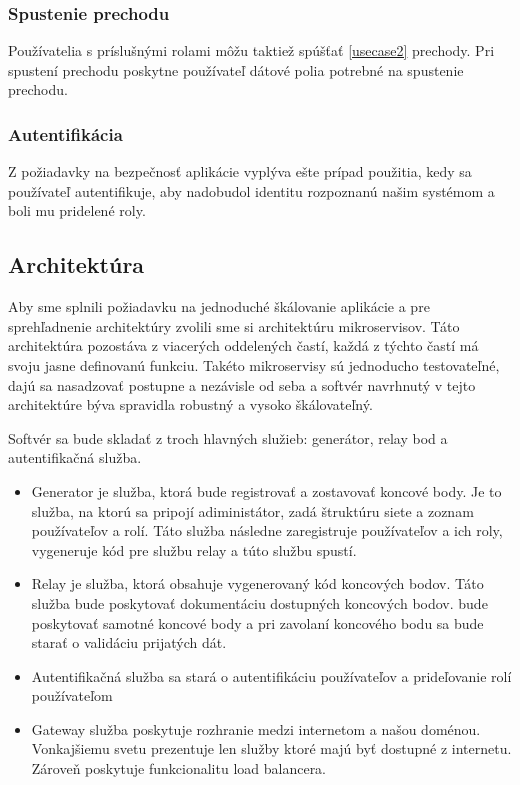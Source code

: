\subsubsection{Spustenie prechodu} 
Používatelia s príslušnými rolami môžu taktiež spúšťať \ref{usecase2} prechody. Pri spustení prechodu poskytne používateľ dátové polia potrebné na spustenie prechodu.  


\subsubsection{Autentifikácia} 
Z požiadavky na bezpečnosť aplikácie vyplýva ešte prípad použitia, kedy sa používateľ autentifikuje, aby nadobudol identitu rozpoznanú našim systémom a boli mu pridelené roly.  


\subsection{Architektúra}  
Aby sme splnili požiadavku na jednoduché škálovanie aplikácie a pre sprehľadnenie architektúry zvolili sme si architektúru mikroservisov. Táto architektúra pozostáva z viacerých oddelených častí, každá z týchto častí má svoju jasne definovanú funkciu. Takéto mikroservisy sú jednoducho testovateľné, dajú sa nasadzovať postupne a nezávisle od seba a softvér navrhnutý v tejto architektúre býva spravidla robustný a vysoko škálovateľný.   

Softvér sa bude skladať z troch hlavných služieb: generátor, relay bod a autentifikačná služba. 

\begin{itemize} 
	\item Generator je služba, ktorá bude registrovať a zostavovať koncové body. Je to služba, na ktorú sa pripojí adiministátor, zadá štruktúru siete a zoznam používateľov a rolí. Táto služba následne zaregistruje používateľov a ich roly, vygeneruje kód pre službu relay a túto službu spustí. 
	
	\item Relay je služba, ktorá obsahuje vygenerovaný kód koncových bodov. Táto služba bude poskytovať dokumentáciu dostupných koncových bodov. bude poskytovať samotné koncové body a pri zavolaní koncového bodu sa bude starať o validáciu prijatých dát. 
	
	\item Autentifikačná služba sa stará o autentifikáciu používateľov a prideľovanie rolí používateľom 
	
	\item Gateway služba poskytuje rozhranie medzi internetom a našou doménou. Vonkajšiemu svetu prezentuje len služby ktoré majú byť dostupné z internetu. Zároveň poskytuje funkcionalitu load balancera.  
	
\end{itemize} 

